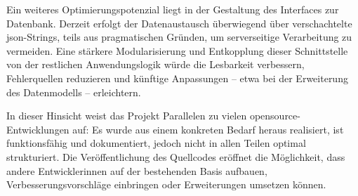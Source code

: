 Ein weiteres Optimierungspotenzial liegt in der Gestaltung des Interfaces zur Datenbank. Derzeit erfolgt der Datenaustausch überwiegend über verschachtelte \gls{json}-Strings, teils aus pragmatischen Gründen, um serverseitige Verarbeitung zu vermeiden. Eine stärkere Modularisierung und Entkopplung dieser Schnittstelle von der restlichen Anwendungslogik würde die Lesbarkeit verbessern, Fehlerquellen reduzieren und künftige Anpassungen -- etwa bei der Erweiterung des Datenmodells -- erleichtern.

In dieser Hinsicht weist das Projekt Parallelen zu vielen \gls{opensource}-Entwicklungen auf: Es wurde aus einem konkreten Bedarf heraus realisiert, ist funktionsfähig und dokumentiert, jedoch nicht in allen Teilen optimal strukturiert. Die Veröffentlichung des Quellcodes eröffnet die Möglichkeit, dass andere Entwickler\genderstern innen auf der bestehenden Basis aufbauen, Verbesserungsvorschläge einbringen oder Erweiterungen umsetzen können.
